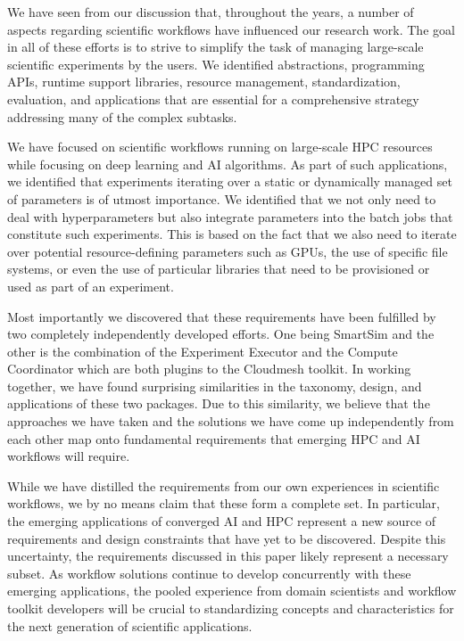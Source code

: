 \documentclass[sigconf]{acmart}
\begin{document}
We have seen from our discussion that, throughout the years, a number of aspects regarding scientific workflows have influenced our research work. The goal in all of these efforts is to strive to simplify the task of managing large-scale scientific experiments by the users. We identified abstractions, programming APIs, runtime support libraries, resource management, standardization, evaluation, and applications that are essential for a comprehensive strategy addressing many of the complex subtasks.

We have focused on scientific workflows running on large-scale HPC resources while focusing on deep learning and AI algorithms. As part of such applications, we identified that experiments iterating over a static or dynamically managed set of parameters is of utmost importance. We identified that we not only need to deal with hyperparameters but also integrate parameters into the batch jobs that constitute such experiments. This is based on the fact that we also need to iterate over potential resource-defining parameters such as GPUs, the use of specific file systems, or even the use of particular libraries that need to be provisioned or used as part of an experiment.

Most importantly we discovered that these requirements have been fulfilled by two completely independently developed efforts. One being SmartSim and the other is the combination of the Experiment Executor and the Compute Coordinator which are both plugins to the Cloudmesh toolkit. In working together, we have found surprising similarities in the taxonomy, design, and applications of these two packages. Due to this similarity, we believe that the approaches we have taken and the solutions we have come up independently from each other map onto fundamental requirements that emerging HPC and AI workflows will require.

While we have distilled the requirements from our own experiences in scientific workflows, we by no means claim that these form a complete set. In particular, the emerging applications of converged AI and HPC \citep{brewer2024ai} represent a new source of requirements and design constraints that have yet to be discovered. Despite this uncertainty, the requirements discussed in this paper likely represent a necessary subset. As workflow solutions continue to develop concurrently with these emerging applications, the pooled experience from domain scientists and workflow toolkit developers will be crucial to standardizing concepts and characteristics for the next generation of scientific applications. 
\clearpage
\end{document}
